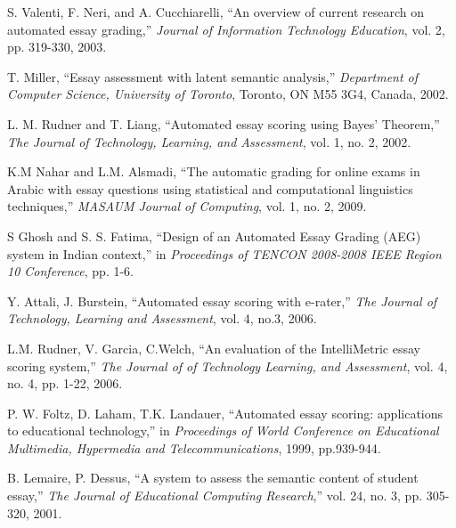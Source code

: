 \documentclass[12pt]{diicc}
\begin{document}
%
% 
%

\begin{thebibliography} {}
	S. Valenti, F. Neri, and A. Cucchiarelli, ``An overview of current research on automated essay grading,'' {\em Journal of Information Technology Education}, vol. 2, pp. 319-330, 2003.
	
	T. Miller, ``Essay assessment with latent semantic analysis,'' {\em Department of Computer Science, University of Toronto}, Toronto, ON M55 3G4, Canada, 2002.
	
	L. M. Rudner and T. Liang, ``Automated essay scoring using Bayes' Theorem,'' {\em The Journal of Technology, Learning, and Assessment}, vol. 1, no. 2, 2002.
	
	K.M Nahar and L.M. Alsmadi, ``The automatic grading for online exams in Arabic with essay questions using statistical and computational linguistics techniques,'' {\em MASAUM Journal of Computing}, vol. 1, no. 2, 2009.
	
	S Ghosh and S. S. Fatima, ``Design of an Automated Essay Grading (AEG) system in Indian context,'' in {\em Proceedings of TENCON 2008-2008 IEEE Region 10 Conference}, pp. 1-6.
	
	Y. Attali, J. Burstein, ``Automated essay scoring with e-rater,'' {\em The Journal of Technology, Learning and Assessment}, vol. 4, no.3, 2006.
	
	L.M. Rudner, V. Garcia, C.Welch, ``An evaluation of the IntelliMetric essay scoring system,'' {\em The Journal of of Technology Learning, and Assessment}, vol. 4, no. 4, pp. 1-22, 2006.
	
	P. W. Foltz, D. Laham, T.K. Landauer, ``Automated essay scoring: applications to educational technology,'' in {\em Proceedings of World Conference on Educational Multimedia, Hypermedia and Telecommunications}, 1999, pp.939-944.
	
	B. Lemaire, P. Dessus, ``A system to assess the semantic content of student essay,'' {\em The Journal of Educational Computing Research},'' vol. 24, no. 3, pp. 305-320, 2001.
	

\end{thebibliography}
\end{document}
